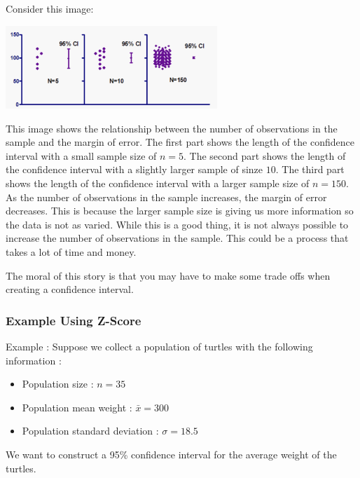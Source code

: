 \documentclass[
  letterpaper,
  DIV=11,
  numbers=noendperiod]{scrreprt}
\providecommand{\tightlist}{%
  \setlength{\itemsep}{0pt}\setlength{\parskip}{0pt}}\usepackage{longtable,booktabs,array}
\begin{document}
Consider this image:

\includegraphics[width=0.6\textwidth,height=\textheight]{./images/EPCI_3.jpg}

This image shows the relationship between the number of observations in
the sample and the margin of error. The first part shows the length of
the confidence interval with a small sample size of \(n=5\). The second
part shows the length of the confidence interval with a slightly larger
sample of sinze \(10\). The third part shows the length of the
confidence interval with a larger sample size of \(n=150\). As the
number of observations in the sample increases, the margin of error
decreases. This is because the larger sample size is giving us more
information so the data is not as varied. While this is a good thing, it
is not always possible to increase the number of observations in the
sample. This could be a process that takes a lot of time and money.

The moral of this story is that you may have to make some trade offs
when creating a confidence interval.

\subsubsection*{Example Using Z-Score}\label{example-using-z-score}

Example : Suppose we collect a population of turtles with the following
information :

\begin{itemize}
\tightlist
\item
  Population size : \(n=35\)
\item
  Population mean weight : \(\bar{x} = 300\)
\item
  Population standard deviation : \(\sigma = 18.5\)
\end{itemize}

We want to construct a 95\% confidence interval for the average weight
of the turtles.
\end{document}
